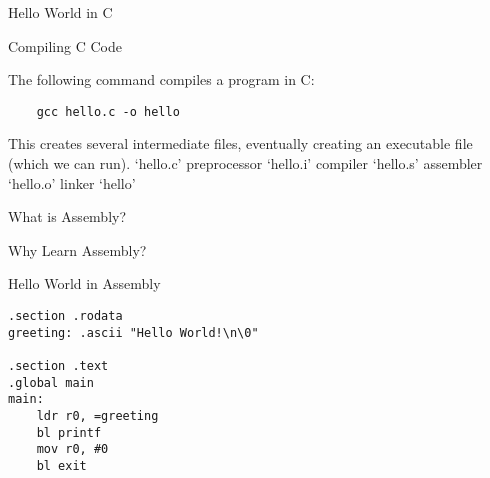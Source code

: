 

\begin{frame}{Hello World in C}
\end{frame}


\begin{frame}[fragile]{Compiling C Code}

The following command compiles a program in C:

\begin{verbatim}
    gcc hello.c -o hello
\end{verbatim}

This creates several intermediate files, eventually creating an executable file (which we can run).
`hello.c'
preprocessor
`hello.i'
compiler
`hello.s'
assembler
`hello.o'
linker
`hello'

\end{frame}




\begin{frame}{What is Assembly?}
\end{frame}


\begin{frame}{Why Learn Assembly?}
\end{frame}




\begin{frame}[fragile]{Hello World in Assembly}

    \begin{verbatim}
.section .rodata
greeting: .ascii "Hello World!\n\0"

.section .text
.global main
main:
    ldr r0, =greeting
    bl printf
    mov r0, #0
    bl exit
\end{verbatim}
\end{frame}














